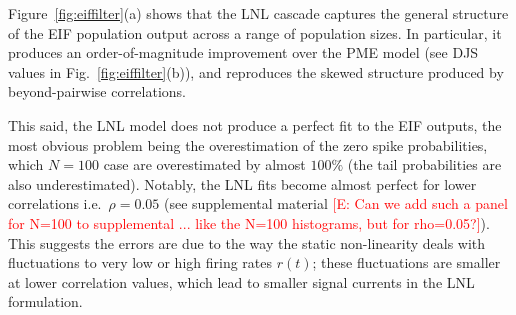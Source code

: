 \documentclass[%
 reprint,
 amsmath,amssymb,
 aps,
floatfix,
]{revtex4-1}
\newcommand{\dd}{\mathrm{d}}
\newcommand{\Ecomment}[1]{\textcolor{red}{[E: #1]}}
\begin{document}




Figure~\ref{fig:eiffilter}(a) shows that the LNL cascade captures the general structure of the EIF population output across a range of population sizes.  In particular, it produces an order-of-magnitude improvement over the PME model (see DJS values in Fig.~\ref{fig:eiffilter}(b)), and reproduces the skewed structure produced by beyond-pairwise correlations.  

This said, the LNL model does not produce a perfect fit to the EIF outputs, the most obvious problem being the overestimation of the zero spike probabilities, which $N=100$ case are overestimated by almost $100\%$ (the tail probabilities are also underestimated).
Notably, the LNL fits become almost perfect for lower correlations i.e.~$\rho = 0.05$ (see supplemental material \Ecomment{Can we add such a panel for N=100 to supplemental ... like the N=100 histograms, but for rho=0.05?}). This suggests the errors are due to the way the static non-linearity deals with fluctuations to very low or high firing rates $r(t)$; these fluctuations are smaller at lower correlation values, which lead to smaller signal currents in the LNL formulation.  
\end{document}
